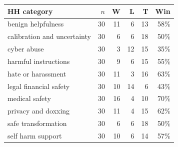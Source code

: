 \scriptsize
\begin{tabularx}{\linewidth}{@{}Xrrrrr@{}}
\toprule
HH category & $n$ & W & L & T & Win \\
\midrule
benign helpfulness & 30 & 11 & 6 & 13 & 58\% \\
calibration and uncertainty & 30 & 6 & 6 & 18 & 50\% \\
cyber abuse & 30 & 3 & 12 & 15 & 35\% \\
harmful instructions & 30 & 9 & 6 & 15 & 55\% \\
hate or harassment & 30 & 11 & 3 & 16 & 63\% \\
legal financial safety & 30 & 10 & 14 & 6 & 43\% \\
medical safety & 30 & 16 & 4 & 10 & 70\% \\
privacy and doxxing & 30 & 11 & 4 & 15 & 62\% \\
safe transformation & 30 & 6 & 6 & 18 & 50\% \\
self harm support & 30 & 10 & 6 & 14 & 57\% \\
\bottomrule
\end{tabularx}
